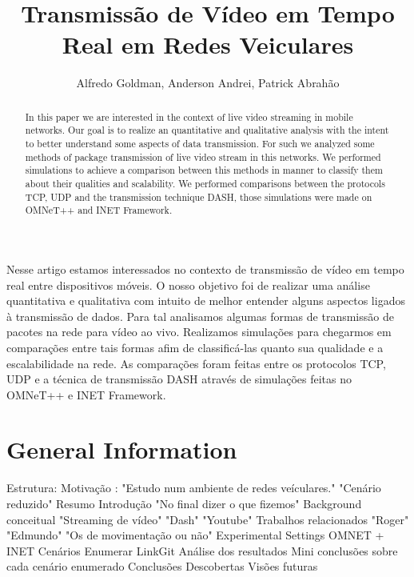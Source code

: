 \documentclass[12pt]{article}
\title{Transmissão de Vídeo em Tempo Real em Redes Veiculares}
\author{Alfredo Goldman, Anderson Andrei, Patrick Abrahão }
\begin{document}
 

\maketitle

\begin{abstract}
In this paper we are interested in the context of live video streaming in mobile networks. Our goal is to realize an quantitative and qualitative analysis with the intent to better understand some aspects of data transmission. For such we analyzed some methods of package transmission of live video stream in this networks. We performed simulations to achieve a comparison between this methods in manner to classify them about their qualities and scalability. We performed comparisons between the protocols TCP, UDP and the transmission technique DASH, those simulations were made on OMNeT++ and INET Framework.
\end{abstract}
     
\begin{resumo} 
  Nesse artigo estamos interessados no contexto de transmissão de vídeo em tempo real entre dispositivos móveis. O nosso objetivo foi de realizar uma análise quantitativa e qualitativa com intuito de melhor entender alguns aspectos ligados à transmissão de dados.  Para tal analisamos algumas formas de transmissão de pacotes na rede para vídeo ao vivo. Realizamos simulações para chegarmos em comparações entre tais formas afim de classificá-las quanto sua qualidade e a escalabilidade na rede. As comparações foram feitas entre os protocolos TCP, UDP e a técnica de transmissão DASH através de simulações feitas no OMNeT++ e INET Framework.
\end{resumo}

\pagebreak

\section{General Information}

Estrutura:
	Motivação : "Estudo num ambiente de redes veículares."
    	"Cenário reduzido"
    Resumo
    Introdução
    	"No final dizer o que fizemos"
    Background conceitual
    	"Streaming de vídeo"
        "Dash"
        	"Youtube"
	Trabalhos relacionados
    	"Roger"
        "Edmundo"
        "Os de movimentação ou não"
	Experimental Settings
    	OMNET + INET
        Cenários Enumerar
        LinkGit
	Análise dos resultados
    	Mini conclusões sobre cada cenário enumerado
    Conclusões
    	Descobertas
        Visões futuras
\end{document}
